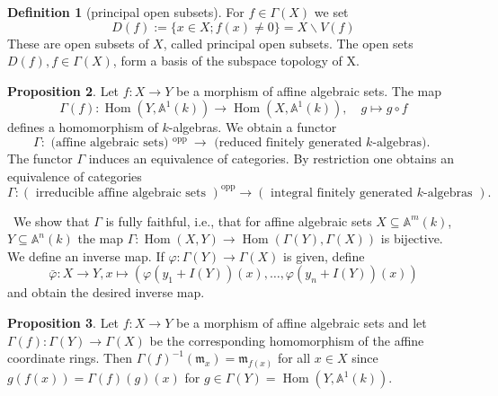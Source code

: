 \documentclass[12pt,a4paper]{book}
\newenvironment{prooff}{{\noindent\it\textcolor{cyan!40!black}{Proof}:}\,}{\par}
\theoremstyle{definition}
\newtheorem{defn}{Definition}[section]
\newtheorem{prop}[defn]{Proposition}
\begin{document}
\begin{defn}[principal open subsets]
    For $f \in \Gamma(X)$ we set
    $$
    D(f):=\{x \in X ; f(x) \neq 0\}=X \backslash V(f)
    $$
    These are open subsets of $X$, called principal open subsets. The open sets $D(f), f \in \Gamma(X)$, form a basis of the subspace topology of X.
\end{defn}
\begin{prop}
      Let $f: X \rightarrow Y$ be a morphism of affine algebraic sets. The map
    $$
    \Gamma(f): \operatorname{Hom}\left(Y, \mathbb{A}^1(k)\right) \rightarrow \operatorname{Hom}\left(X, \mathbb{A}^1(k)\right), \quad g \mapsto g \circ f
    $$
    defines a homomorphism of $k$-algebras. We obtain a functor
    $$
    \Gamma: \text { (affine algebraic sets) }{ }^{\text {opp }} \rightarrow \text { (reduced finitely generated } k \text {-algebras). }
    $$
    The functor $\Gamma$ induces an equivalence of categories. By restriction one obtains an equivalence of categories
    $$
    \Gamma:(\text { irreducible affine algebraic sets })^{\mathrm{opp}} \rightarrow(\text { integral finitely generated } k \text {-algebras }) \text {. }
    $$
\end{prop}
\begin{prooff}
    We show that $\Gamma$ is fully faithful, i.e., that for affine algebraic sets $X \subseteq \mathbb{A}^m(k)$, $Y \subseteq \mathbb{A}^n(k)$ the map $\Gamma: \operatorname{Hom}(X, Y) \rightarrow \operatorname{Hom}(\Gamma(Y), \Gamma(X))$ is bijective. 
    We define an inverse map. If $\varphi: \Gamma(Y) \rightarrow \Gamma(X)$ is given, define 
    $$
    \bar{\varphi}:X\rightarrow Y, x\mapsto (\varphi(y_1+I(Y))(x),\dots,\varphi(y_n+I(Y))(x))
    $$
    and obtain the desired inverse map.
\end{prooff}
\begin{prop}
    Let $f: X \rightarrow Y$ be a morphism of affine algebraic sets and let $\Gamma(f): \Gamma(Y) \rightarrow \Gamma(X)$ be the corresponding homomorphism of the affine coordinate rings. Then $\Gamma(f)^{-1}\left(\mathfrak{m}_x\right)=\mathfrak{m}_{f(x)}$ for all $x \in X$ since $g(f(x))=\Gamma(f)(g)(x)$ for $g \in \Gamma(Y)=\operatorname{Hom}\left(Y, \mathbb{A}^1(k)\right)$.
\end{prop}   
\end{document}

